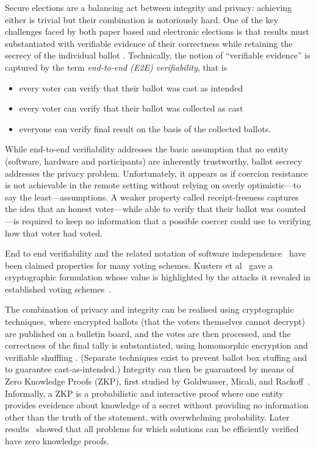 \documentclass{llncs}
\begin{document}
Secure elections are a balancing act between integrity and privacy:
achieving either is trivial but their combination is notoriously hard.
One of the key challenges faced by both paper based and electronic
elections is that results must substantiated with
verifiable evidence of their correctness while retaining the secrecy
of the individual ballot \cite{Bernhard:2017:PES}.  Technically, the
notion of ``verifiable evidence'' is captured by the term 
\emph{end-to-end (E2E) verifiability}, that is
\begin{itemize}
  \item every voter can verify that their ballot was cast as
  intended
  \item every voter can verify that their ballot was collected as
  cast
  \item everyone can verify final result on the basis of the
  collected ballots.
\end{itemize}
While end-to-end verifiability addresses the basic assumption that
no entity (software, hardware and participants) are inherently
trustworthy, ballot secrecy addresses the privacy problem.
Unfortunately, it appears as if coercion resistance is not achievable  
in the remote setting without relying on overly optimistic---to say the least---assumptions.
A weaker property called receipt-freeness captures the idea that an honest 
voter---while able to verify that their ballot was counted---is required to keep 
no information that a possible coercer could use to verifying how that voter had voted.

End to end verifiability and the related notation of software independence~\cite{Rivest:2008:PTRS}
 have been claimed properties for many voting schemes.  Kusters et al~\cite{Kusters:2010:CCS} gave
 a cryptographic formulation whose value is highlighted by the attacks it revealed in established voting 
 schemes~\cite{Kusters:2012:SP}.

The combination of privacy and integrity can be realised using cryptographic techniques, where
encrypted ballots (that the voters themselves cannot decrypt) are
published on a bulletin board, and the votes are then processed, and
the correctness of the final tally is substantiated, using
homomorphic encryption \cite{Hirt:2000:ERF} and verifiable shuffling
\cite{Bayer:2012:EZK}. (Separate techniques exist to prevent ballot
box stuffing and to guarantee cast-as-intended.)
Integrity can then be guaranteed by means of Zero Knowledge Proofs
(ZKP),
first studied by Goldwasser, Micali, and Rackoff~\cite{Goldwasser:1985:STOC}.
Informally, a ZKP is a probabilistic and interactive proof where one
entity provides eveidence about knowledge of a secret without
providing no information other than the truth of the statement, with
overwhelming probability. 
Later results~\cite{Goldreich:1991:ACM}\cite{Ben-Or:1988:CRYPTO} showed that 
all problems for which solutions can be efficiently verified have zero knowledge
proofs.
\end{document}
